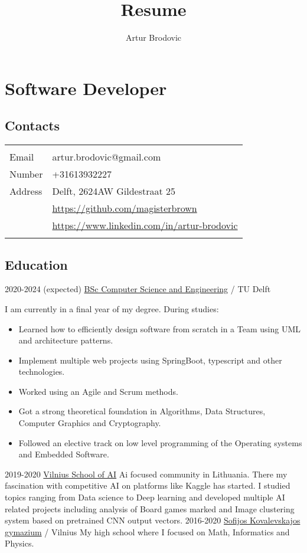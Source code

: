 \documentclass{article}
\begin{document}
\title{Resume}
\author{Artur Brodovic}
\maketitle

\section{Software Developer}
\subsection{Contacts}
\renewcommand{\arraystretch}{1.3}
\vspace{0.5em}
\begin{tabular}{l l}
    \hline \\[-1.0em]
    Email & artur.brodovic@gmail.com \\
    Number & +31613932227 \\
    Address & Delft, 2624AW Gildestraat 25 \\
     & \url{https://github.com/magisterbrown}\\
     & \url{https://www.linkedin.com/in/artur-brodovic}\\
    \\[-1.0em] \hline 
\end{tabular}
\subsection{Education}
\cvitem
{2020-2024 (expected)}
{\href{https://www.tudelft.nl/onderwijs/opleidingen/bachelors/cse/bsc-computer-science-and-engineering}{BSc Computer Science and Engineering}}
{/ TU Delft}
{I am currently in a final year of my degree. During studies: 
\begin{itemize}
\setlength\itemsep{0.25em}
\item Learned how to efficiently design software from scratch in a Team using UML and architecture patterns. 
\item Implement multiple web projects using SpringBoot, typescript and other technologies.
\item Worked using an Agile and Scrum methods. 
\item Got a strong theoretical foundation in Algorithms, Data Structures, Computer Graphics and Cryptography. 
\item Followed an elective track on low level programming of the Operating systems and Embedded Software.
\end{itemize}
}
\cvitem
{2019-2020}
{\href{https://www.linkedin.com/school/vilnius-school-of-ai/?originalSubdomain=lt}{Vilnius School of AI}}
{}
{Ai focused community in Lithuania. There my fascination with competitive AI on platforms like Kaggle has started. I studied topics ranging from Data science to Deep learning and developed multiple AI related projects including analysis of Board games marked and Image clustering system based on pretrained CNN output vectors.}
\cvitem
{2016-2020}
{\href{https://skg.lt/}{Sofijos Kovalevskajos gymazium}}
{/ Vilnius}
{My high school where I focused on Math, Informatics and Physics.}
\end{document}
